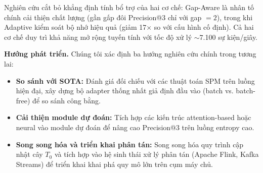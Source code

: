 \documentclass[conference]{IEEEtran}
\begin{document}
Nghiên cứu cắt bỏ khẳng định tính bổ trợ của hai cơ chế: Gap-Aware là nhân tố chính cải thiện chất lượng (gần gấp đôi Precision@3 chỉ với gap $= 2$), trong khi Adaptive kiểm soát bộ nhớ hiệu quả (giảm 17$\times$ so với cấu hình cố định). Cả hai cơ chế duy trì khả năng mở rộng tuyến tính với tốc độ xử lý $\sim$7.100 sự kiện/giây.

\textbf{Hướng phát triển.} Chúng tôi xác định ba hướng nghiên cứu chính trong tương lai:
\begin{itemize}
    \item \textbf{So sánh với SOTA:} Đánh giá đối chiếu với các thuật toán SPM trên luồng hiện đại, xây dựng bộ adapter thống nhất giả định đầu vào (batch vs. batch-free) để so sánh công bằng.
    \item \textbf{Cải thiện module dự đoán:} Tích hợp các kiến trúc attention-based hoặc neural vào module dự đoán để nâng cao Precision@3 trên luồng entropy cao.
    \item \textbf{Song song hóa và triển khai phân tán:} Song song hóa quy trình cập nhật cây $T_0$ và tích hợp vào hệ sinh thái xử lý phân tán (Apache Flink, Kafka Streams) để triển khai khai phá quy mô lớn trên cụm máy chủ.
\end{itemize}



\end{document}
